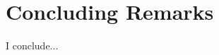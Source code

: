 \documentclass[../main.tex]{subfiles}
\begin{document}
\chapter{Concluding Remarks}

I conclude...

\ifSubfilesClassLoaded{}{}
\end{document}
